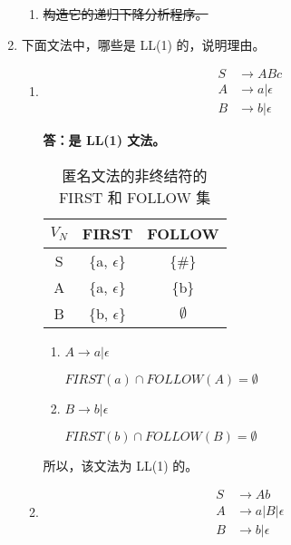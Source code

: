 \begin{enumerate}
\begin{enumerate}
        \item \sout{构造它的递归下降分析程序。}
    \end{enumerate}
    
    \item 下面文法中，哪些是 LL(1) 的，说明理由。
    
    \begin{enumerate}
        \item \begin{align*}
            S & \to ABc \\
            A & \to a | \epsilon \\
            B & \to b | \epsilon
        \end{align*}
        
        \textbf{答：是 LL(1) 文法。}
        
        \begin{table}[H]
            \centering
            \begin{tabular}{|c|c|c|}
                \hline
                $V_N$ & FIRST & FOLLOW \\
                \hline
                S & \{a, $\epsilon$\} & \{\#\} \\
                \hline
                A & \{a, $\epsilon$\} & \{b\} \\
                \hline
                B & \{b, $\epsilon$\} & $\emptyset$ \\
                \hline
            \end{tabular}
            \caption{匿名文法的非终结符的 FIRST 和 FOLLOW 集}
            \label{tab:FF3_1}
        \end{table}
        
        \begin{enumerate}
            \item $A \to a | \epsilon$
            
            $FIRST(a) \cap FOLLOW(A) = \emptyset$
            
            \item $B \to b | \epsilon$
            
            $FIRST(b) \cap FOLLOW(B) = \emptyset$
            
        \end{enumerate}
        
        所以，该文法为 LL(1) 的。
        
        \item \begin{align*}
            S & \to Ab \\
            A & \to a | B | \epsilon \\
            B & \to b | \epsilon
        \end{align*}
        

\end{enumerate}
\end{enumerate}
